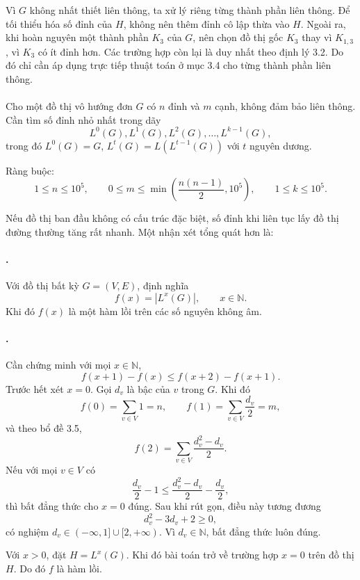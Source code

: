 \documentclass[11pt]{article}
\begin{document}
Vì \(G\) không nhất thiết liên thông, ta xử lý riêng từng thành phần liên thông.
Để tối thiểu hóa số đỉnh của \(H\), không nên thêm đỉnh cô lập thừa vào \(H\).
Ngoài ra, khi hoàn nguyên một thành phần \(K_3\) của \(G\), nên chọn đồ thị gốc
\(K_3\) thay vì \(K_{1,3}\), vì \(K_3\) có ít đỉnh hơn. Các trường hợp còn lại
là duy nhất theo định lý 3.2. Do đó chỉ cần áp dụng trực tiếp thuật toán ở mục
3.4 cho từng thành phần liên thông.

\paragraph{}
Cho một đồ thị vô hướng đơn \(G\) có \(n\) đỉnh và \(m\) cạnh, không đảm bảo
liên thông. Cần tìm số đỉnh nhỏ nhất trong dãy
\[
  L^0(G),L^1(G),L^2(G),\ldots,L^{k-1}(G),
\]
trong đó \(L^0(G)=G\), \(L^t(G)=L(L^{t-1}(G))\) với \(t\) nguyên dương.

Ràng buộc:
\[
  1\le n\le 10^5,\qquad
  0\le m\le \min\left(\frac{n(n-1)}2,10^5\right),\qquad
  1\le k\le 10^5.
\]

Nếu đồ thị ban đầu không có cấu trúc đặc biệt, số đỉnh khi liên tục lấy đồ thị
đường thường tăng rất nhanh. Một nhận xét tổng quát hơn là:

\paragraph{.}
Với đồ thị bất kỳ \(G=(V,E)\), định nghĩa
\[
  f(x)=|L^x(G)|,\qquad x\in\mathbb N.
\]
Khi đó \(f(x)\) là một hàm lồi trên các số nguyên không âm.

\paragraph{.}
Cần chứng minh với mọi \(x\in\mathbb N\),
\[
  f(x+1)-f(x)\le f(x+2)-f(x+1).
\]
Trước hết xét \(x=0\). Gọi \(d_v\) là bậc của \(v\) trong \(G\). Khi đó
\[
  f(0)=\sum_{v\in V}1=n,\qquad
  f(1)=\sum_{v\in V}\frac{d_v}{2}=m,
\]
và theo bổ đề 3.5,
\[
  f(2)=\sum_{v\in V}\frac{d_v^2-d_v}{2}.
\]
Nếu với mọi \(v\in V\) có
\[
  \frac{d_v}{2}-1\le
  \frac{d_v^2-d_v}{2}-\frac{d_v}{2},
\]
thì bất đẳng thức cho \(x=0\) đúng. Sau khi rút gọn, điều này tương đương
\[
  d_v^2-3d_v+2\ge 0,
\]
có nghiệm \(d_v\in(-\infty,1]\cup[2,+\infty)\). Vì \(d_v\in\mathbb N\), bất
đẳng thức luôn đúng.

Với \(x>0\), đặt \(H=L^x(G)\). Khi đó bài toán trở về trường hợp \(x=0\) trên
đồ thị \(H\). Do đó \(f\) là hàm lồi.
\end{document}
